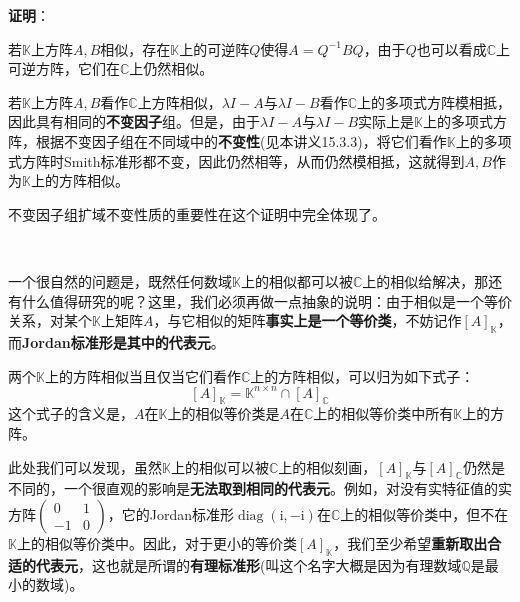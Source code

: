 \documentclass[a4paper,UTF8,fontset=windows,AutoFakeBold]{ctexart}
\DeclareMathOperator{\diag}{diag}
\newcommand*{\ir}{\mathrm{i}}
\newcommand*{\note}{\noindent *}
\newcommand{\proo}[1]{{\vspace{5pt}\kaishu\noindent\textbf{证明}：\vspace{-3pt}
\begin{compactitem}
    \item[] #1
\end{compactitem}
}}
\begin{document}
\proo{
    若$\mathbb{K}$上方阵$A,B$相似，存在$\mathbb{K}$上的可逆阵$Q$使得$A=Q^{-1}BQ$，由于$Q$也可以看成$\mathbb{C}$上可逆方阵，它们在$\mathbb{C}$上仍然相似。

    若$\mathbb{K}$上方阵$A,B$看作$\mathbb{C}$上方阵相似，$\lambda I-A$与$\lambda I-B$看作$\mathbb{C}$上的多项式方阵模相抵，因此具有相同的\textbf{不变因子}组。但是，由于$\lambda I-A$与$\lambda I-B$实际上是$\mathbb{K}$上的多项式方阵，根据不变因子组在不同域中的\textbf{不变性}(见本讲义15.3.3)，将它们看作$\mathbb{K}$上的多项式方阵时Smith标准形都不变，因此仍然相等，从而仍然模相抵，这就得到$A,B$作为$\mathbb{K}$上的方阵相似。
}

\note 不变因子组扩域不变性质的重要性在这个证明中完全体现了。

\

一个很自然的问题是，既然任何数域$\mathbb{K}$上的相似都可以被$\mathbb{C}$上的相似给解决，那还有什么值得研究的呢？这里，我们必须再做一点抽象的说明：由于相似是一个等价关系，对某个$\mathbb{K}$上矩阵$A$，与它相似的矩阵\textbf{事实上是一个等价类}，不妨记作$[A]_\mathbb{K}$，而\textbf{Jordan标准形是其中的代表元}。

两个$\mathbb{K}$上的方阵相似当且仅当它们看作$\mathbb{C}$上的方阵相似，可以归为如下式子：
$$[A]_{\mathbb{K}}=\mathbb{K}^{n\times n}\cap [A]_\mathbb{C}$$
这个式子的含义是，$A$在$\mathbb{K}$上的相似等价类是$A$在$\mathbb{C}$上的相似等价类中所有$\mathbb{K}$上的方阵。

此处我们可以发现，虽然$\mathbb{K}$上的相似可以被$\mathbb{C}$上的相似刻画，$[A]_{\mathbb{K}}$与$[A]_\mathbb{C}$仍然是不同的，一个很直观的影响是\textbf{无法取到相同的代表元}。例如，对没有实特征值的实方阵$\begin{pmatrix}0&1\\-1&0\end{pmatrix}$，它的Jordan标准形$\diag(\ir,-\ir)$在$\mathbb{C}$上的相似等价类中，但不在$\mathbb{K}$上的相似等价类中。因此，对于更小的等价类$[A]_{\mathbb{K}}$，我们至少希望\textbf{重新取出合适的代表元}，这也就是所谓的\textbf{有理标准形}(叫这个名字大概是因为有理数域$\mathbb{Q}$是最小的数域)。

\
\end{document}
